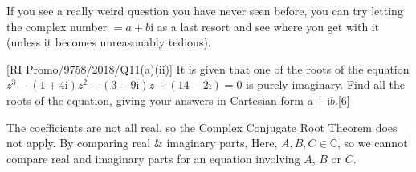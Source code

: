 \begin{info}[title=Note]
If you see a really weird question you have never seen before, you can try letting the complex number $=a+b\mathrm{i}$ as a last resort and see where you get with it (unless it becomes unreasonably tedious).
\end{info}
\clearpage
\exlab
{\small[RI Promo/9758/2018/Q11(a)(ii)]} It is given that one of the roots of the equation $z^{3}-(1+4\mathrm{i})z^{2}-(3-9\mathrm{i})z+(14-2\mathrm{i})=0$ is purely imaginary. Find all the roots of the equation, giving your answers in Cartesian form $a+\mathrm{i}b$.\hfill[6]\par
{\color{gray}The coefficients are not all real, so the Complex Conjugate Root Theorem does not apply.}
By comparing real \& imaginary parts,
{\color{gray}Here, $A,B,C\in\mathbb{C}$, so we cannot compare real and imaginary parts for an equation involving $A$, $B$ or $C$.}

